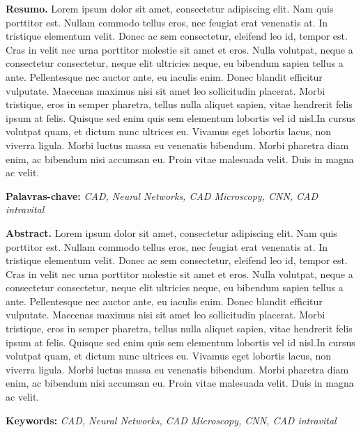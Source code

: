 \thispagestyle{plain}

\vspace{1.0cm}
   
\renewcommand{\baselinestretch}{0.6666666}
{\bf Resumo.} Lorem ipsum dolor sit amet, consectetur adipiscing elit. Nam quis porttitor est. Nullam commodo tellus eros, nec feugiat erat venenatis at. In tristique elementum velit. Donec ac sem consectetur, eleifend leo id, tempor est. Cras in velit nec urna porttitor molestie sit amet et eros. Nulla volutpat, neque a consectetur consectetur, neque elit ultricies neque, eu bibendum sapien tellus a ante. Pellentesque nec auctor ante, eu iaculis enim. Donec blandit efficitur vulputate. Maecenas maximus nisi sit amet leo sollicitudin placerat. Morbi tristique, eros in semper pharetra, tellus nulla aliquet sapien, vitae hendrerit felis ipsum at felis. Quisque sed enim quis sem elementum lobortis vel id nisl.In cursus volutpat quam, et dictum nunc ultrices eu. Vivamus eget lobortis lacus, non viverra ligula. Morbi luctus massa eu venenatis bibendum. Morbi pharetra diam enim, ac bibendum nisi accumsan eu. Proin vitae malesuada velit. Duis in magna ac velit.
\begin{flushleft}
{\bf Palavras-chave:} {\it CAD, Neural Networks, CAD Microscopy, CNN, CAD intravital}
\\[2.5cm]
\end{flushleft}


{\bf Abstract.} Lorem ipsum dolor sit amet, consectetur adipiscing elit. Nam quis porttitor est. Nullam commodo tellus eros, nec feugiat erat venenatis at. In tristique elementum velit. Donec ac sem consectetur, eleifend leo id, tempor est. Cras in velit nec urna porttitor molestie sit amet et eros. Nulla volutpat, neque a consectetur consectetur, neque elit ultricies neque, eu bibendum sapien tellus a ante. Pellentesque nec auctor ante, eu iaculis enim. Donec blandit efficitur vulputate. Maecenas maximus nisi sit amet leo sollicitudin placerat. Morbi tristique, eros in semper pharetra, tellus nulla aliquet sapien, vitae hendrerit felis ipsum at felis. Quisque sed enim quis sem elementum lobortis vel id nisl.In cursus volutpat quam, et dictum nunc ultrices eu. Vivamus eget lobortis lacus, non viverra ligula. Morbi luctus massa eu venenatis bibendum. Morbi pharetra diam enim, ac bibendum nisi accumsan eu. Proin vitae malesuada velit. Duis in magna ac velit.\begin{flushleft}
{\bf Keywords:} {\it CAD, Neural Networks, CAD Microscopy, CNN, CAD intravital}
\end{flushleft}
